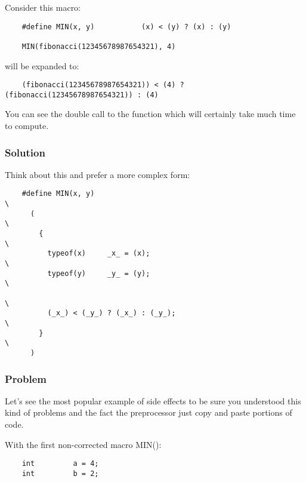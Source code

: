 {\begin{frame}[containsverbatim]
  \nl

  Consider this macro:

  \begin{verbatim}
    #define MIN(x, y)           (x) < (y) ? (x) : (y)

    MIN(fibonacci(12345678987654321), 4)
  \end{verbatim}

  will be expanded to:

  \begin{verbatim}
    (fibonacci(12345678987654321)) < (4) ? (fibonacci(12345678987654321)) : (4)
  \end{verbatim}

  You can see the double call to the function which will certainly take
  much time to compute.
\end{frame}


\begin{frame}[containsverbatim]
  \frametitle{Solution}

  Think about this and prefer a more complex form:

  \begin{verbatim}
    #define MIN(x, y)                                                   \
      (                                                                 \
        {                                                               \
          typeof(x)     _x_ = (x);                                      \
          typeof(y)     _y_ = (y);                                      \
                                                                        \
          (_x_) < (_y_) ? (_x_) : (_y_);                                \
        }                                                               \
      )
  \end{verbatim}
\end{frame}


\begin{frame}[containsverbatim]
  \frametitle{Problem}

  Let's see the most popular example of side effects to be sure
  you understood this kind of problems and the fact the preprocessor just copy
  and paste portions of code.

  \nl

  With the first non-corrected macro MIN():

  \begin{verbatim}
    int         a = 4;
    int	        b = 2;


\end{verbatim}
\end{frame}}
